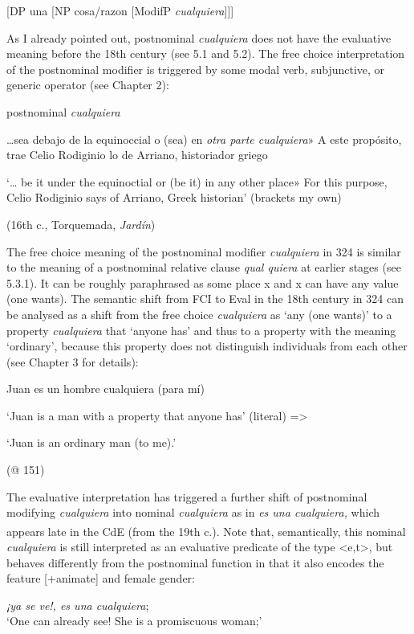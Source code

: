 \documentclass[output=paper]{langscibook}
\begin{document}
  [DP una [NP cosa/razon [ModifP \textit{cualquiera}]]] 


As I already pointed out, postnominal \textit{cualquiera} does not have the evaluative meaning before the 18th century (see 5.1 and 5.2). The free choice interpretation of the postnominal modifier is triggered by some modal verb, subjunctive, or generic operator (see Chapter 2):

  postnominal \textit{cualquiera}

  …sea debajo de la equinoccial o (sea) en \textit{otra parte cualquiera}» A este propósito, trae Celio Rodiginio lo de Arriano, historiador griego

  ‘… be it under the equinoctial or (be it) in any other place» For this purpose, Celio Rodiginio says of Arriano, Greek historian’ (brackets my own)

  (16th c., Torquemada, \textit{Jardín})

The free choice meaning of the postnominal modifier \textit{cualquiera} in 324 is similar to the meaning of a postnominal relative clause \textit{qual quiera} at earlier stages (see 5.3.1). It can be roughly paraphrased as some place x and x can have any value (one wants). The semantic shift from FCI to Eval in the 18th century in 324 can be analysed as a shift from the free choice \textit{cualquiera} as ‘any (one wants)’ to a property \textit{cualquiera} that ‘anyone has’ and thus to a property with the meaning ‘ordinary’, because this property does not distinguish individuals from each other (see Chapter 3 for details): 

  Juan es un hombre cualquiera (para mí)

  ‘Juan is a man with a property that anyone has’ (literal) =>

‘Juan is an ordinary man (to me).’

  (@ 151)

The evaluative interpretation has triggered a further shift of postnominal modifying \textit{cualquiera} into nominal \textit{cualquiera} as in \textit{es una cualquiera,} which appears late in the CdE (from the 19th\textsuperscript{} c.). Note that, semantically, this nominal \textit{cualquiera} is still interpreted as an evaluative predicate of the type <e,t>, but behaves differently from the postnominal function in that it also encodes the feature [+animate] and female gender:

  \textit{¡ya se ve!, es una cualquiera};\\
‘One can already see! She is a promiscuous woman;’ 
\end{document}

